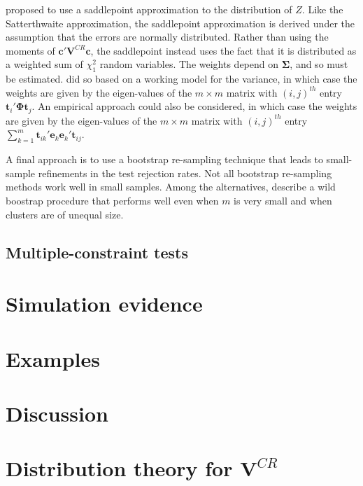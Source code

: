 \documentclass[12pt]{article}\usepackage[]{graphicx}\usepackage[]{color}
\newcommand{\bm}{\mathbf}
\newcommand{\bs}{\boldsymbol}
\begin{document}
\citet{McCaffrey2006improved} proposed to use a saddlepoint approximation to the distribution of $Z$. Like the Satterthwaite approximation, the saddlepoint approximation is derived under the assumption that the errors are normally distributed. Rather than using the moments of $\bm{c}'\bm{V}^{CR}\bm{c}$, the saddlepoint instead uses the fact that it is distributed as a weighted sum of $\chi^2_1$ random variables. The weights depend on $\bs\Sigma$, and so must be estimated. \citet{McCaffrey2006improved} did so based on a working model for the variance, in which case the weights are given by the eigen-values of the $m \times m$ matrix with $(i,j)^{th}$ entry $\bm{t}_i'\bs\Phi \bm{t}_j$. An empirical approach could also be considered, in which case the weights are given by the eigen-values of the $m \times m$ matrix with $(i,j)^{th}$ entry $\sum_{k=1}^m \bm{t}_{ik}'\bm{e}_k \bm{e}_k' \bm{t}_{ij}$.

A final approach is to use a bootstrap re-sampling technique that leads to small-sample refinements in the test rejection rates. Not all bootstrap re-sampling methods work well in small samples. Among the alternatives, \citet{Webb2013wild} describe a wild boostrap procedure that performs well even when $m$ is very small and when clusters are of unequal size. 

\subsection{Multiple-constraint tests}

\section{Simulation evidence}
\label{sec:simulations}

\section{Examples}
\label{sec:examples}

\section{Discussion}
\label{sec:discussion}

\appendix
\section{Distribution theory for $\bm{V}^{CR}$}
\label{app:VCR_dist}
\end{document}
